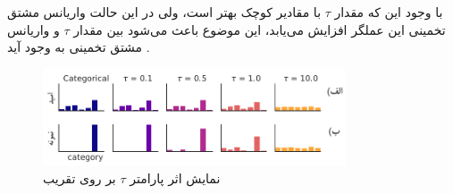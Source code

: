 \newline
با وجود این که مقدار $\tau$ با مقادیر کوچک بهتر است، ولی در این حالت واریانس مشتق تخمینی این عملگر افزایش می‌یابد، این موضوع باعث می‌شود بین مقدار $\tau$ و واریانس مشتق تخمینی 
به وجود آید
\cite{JanGuPoo17}.
\begin{figure}[!htb]
	\centering
	\includegraphics[width=0.8\textwidth]{images/GumbelSoftmaxTemperatureEffect.pdf} 
	\caption[نمایش اثر پارامتر $\tau$ بر روی تقریب 
	]{
		نمایش اثر پارامتر $\tau$ بر روی تقریب 
		\cite{JanGuPoo17}
	}
	\label{Figure:GumbelSoftmax:TemperatureEffect}
\end{figure}

